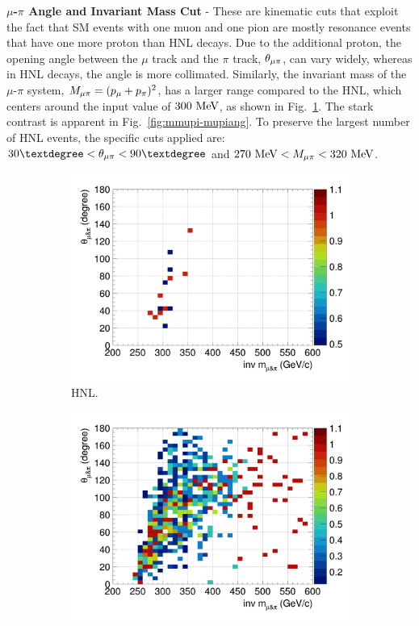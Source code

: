         \textbf{$\mu$-$\pi$ Angle and Invariant Mass Cut} - These are kinematic cuts that exploit the fact that SM events with one muon and one pion are mostly resonance events that have one more proton than HNL decays. Due to the additional proton, the opening angle between the $\mu$ track and the $\pi$ track, $\theta_{\mu\pi}$, can vary widely, whereas in HNL decays, the angle is more collimated. Similarly, the invariant mass of the $\mu$-$\pi$ system, $M_{\mu\pi}=(p_{\mu}+p_{\pi})^2$, has a larger range compared to the HNL, which centers around the input value of $300~\textrm{MeV}$, as shown in Fig.~\ref{fig:hnl-mmupi}.
        The stark contrast is apparent in Fig.~\ref{fig:mmupi-mupiang}. To preserve the largest number of HNL events, the specific cuts applied are: $30\deg < \tmupi < 90\deg$ and $270~\textrm{MeV}<M_{\mu\pi}<320~\textrm{MeV}$. 
        \begin{figure}[!htb]
           \centering
           \begin{subfigure}{\dbfigwid\textwidth}
                \includegraphics[width=\textwidth]{figures/hnl_sfgmu_mpinvm_colnor_vs_mpang_hist2d_al9_300.png}
                \caption{HNL.}
                \label{fig:hnl-mmupi}
           \end{subfigure}
           \begin{subfigure}{\dbfigwid\textwidth}
                \includegraphics[width=\textwidth]{figures/hnl_sfgmu_mpinvm_colnor_vs_mpang_hist2d_al9_SM.png}

\end{subfigure}
\end{figure}
